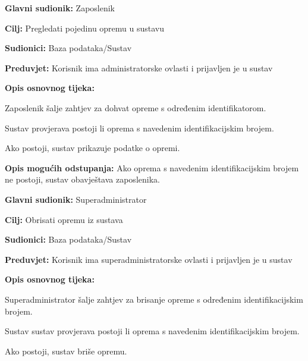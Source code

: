 \noindent {}
\begin{packed_item}
	
	\item \textbf{Glavni sudionik: }Zaposlenik
	\item  \textbf{Cilj:} Pregledati pojedinu opremu u sustavu
	\item  \textbf{Sudionici:} Baza podataka/Sustav
	\item  \textbf{Preduvjet:} Korisnik ima administratorske ovlasti i prijavljen je u sustav
	\item  \textbf{Opis osnovnog tijeka:}
	
	\item[] \begin{packed_enum}
		
		\item Zaposlenik šalje zahtjev za dohvat opreme s određenim identifikatorom.
		\item Sustav provjerava postoji li oprema s navedenim identifikacijskim brojem.
		\item Ako postoji, sustav prikazuje podatke o opremi.
		
	\end{packed_enum}
	
	\item  \textbf{Opis mogućih odstupanja:} Ako oprema s navedenim identifikacijskim brojem ne postoji, sustav obavještava zaposlenika.
	
	
\end{packed_item}

\noindent {}
\begin{packed_item}
	
	\item \textbf{Glavni sudionik: }Superadministrator
	\item  \textbf{Cilj:} Obrisati opremu iz sustava
	\item  \textbf{Sudionici:} Baza podataka/Sustav
	\item  \textbf{Preduvjet:} Korisnik ima superadministratorske ovlasti i prijavljen je u sustav
	\item  \textbf{Opis osnovnog tijeka:}
	
	\item[] \begin{packed_enum}
		
		\item Superadministrator šalje zahtjev za brisanje opreme s određenim identifikacijskim brojem.
		\item Sustav sustav provjerava postoji li oprema s navedenim identifikacijskim brojem.
		\item Ako postoji, sustav briše opremu.
		
	\end{packed_enum}
	
	
\end{packed_item}

